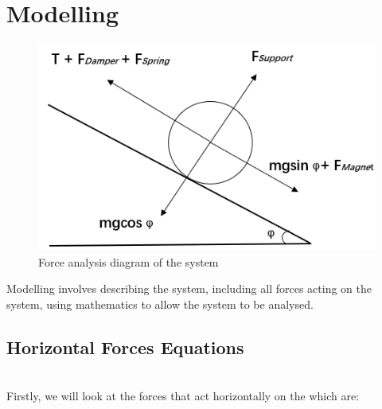 \section{Modelling}
\begin{figure}[ht]
    \centering
    \begin{minipage}{0.6\textwidth}
        \centering
        \includegraphics[width=1.20\linewidth]{modelling/Force analysis diagram of the system.png}
        \caption{Force analysis diagram of the system} 
    \end{minipage}
\end{figure}
Modelling involves describing the system, including all forces acting on the system, using mathematics to
allow the system to be analysed. 
\subsection*{Horizontal Forces Equations} \hfill \\
Firstly, we will look at the forces that act horizontally on the which are:


